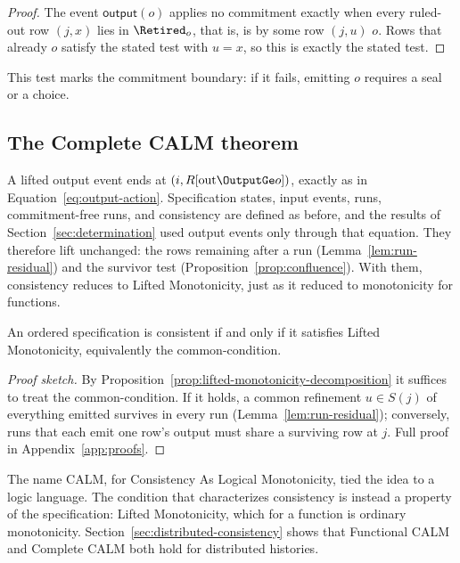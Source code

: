 \begin{proof}
The event $\mathsf{output}(o)$ applies no commitment exactly when every
ruled-out row $(j,x)$ lies in $\Retired_o$, that is, is \outrelpast by some row
$(j,u)$ \outrelpart $o$.  Rows that already \outrelbase $o$ satisfy the stated
test with $u=x$, so this is exactly the stated test.
\end{proof}

This test marks the commitment boundary: if it fails, emitting $o$ requires a
seal or a choice.

\subsection{The Complete CALM theorem}
\label{sec:relational-executions}
\label{sec:complete-calm-theorem}

A lifted output event ends at $(i,R[\mathrm{out}\OutputGe o])$, exactly as in
Equation~\ref{eq:output-action}.  Specification states, input events, runs,
commitment-free runs, and consistency are defined as before, and the results
of Section~\ref{sec:determination} used output events only through that
equation.  They therefore lift unchanged: the rows remaining after a run
(Lemma~\ref{lem:run-residual}) and the survivor test
(Proposition~\ref{prop:confluence}).  With them, consistency
reduces to Lifted Monotonicity, just as it reduced to monotonicity for
functions.

\begin{theorem}
\label{thm:complete-calm}
\label{thm:common-refinement}
An ordered specification is consistent if and only if it satisfies Lifted
Monotonicity, equivalently the common-\indesc condition.
\end{theorem}

\begin{proof}[Proof sketch]
By Proposition~\ref{prop:lifted-monotonicity-decomposition} it suffices to
treat the common-\indesc condition.  If it holds, a common refinement $u\in S(j)$ of everything emitted survives in every run (Lemma~\ref{lem:run-residual}); conversely, runs that each emit one row's output must share a surviving row at $j$.  Full proof in Appendix~\ref{app:proofs}.
\end{proof}

The name CALM, for Consistency As Logical Monotonicity, tied the idea to a
logic language.  The condition that characterizes consistency is instead a
property of the specification: Lifted Monotonicity, which for a function is
ordinary monotonicity.  Section~\ref{sec:distributed-consistency} shows that
Functional CALM and Complete CALM both hold for distributed histories.

